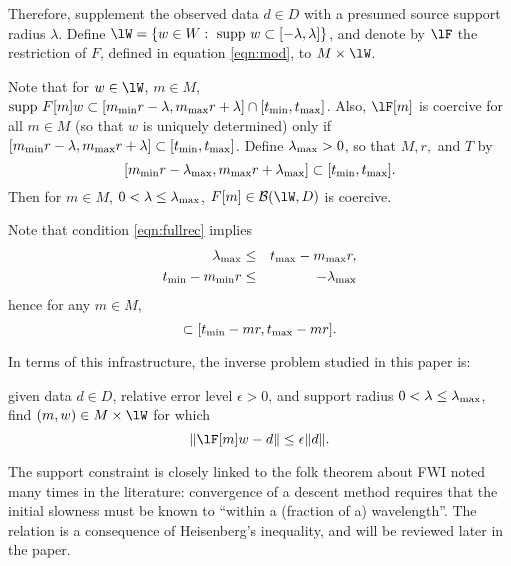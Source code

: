Therefore, supplement the observed data $d \in D$ with a presumed 
source support radius $\lambda$. Define 
$\lW=\{w \in W: \mbox{ supp }w \subset [-\lambda,\lambda]\}$, and 
denote by $\lF$ the restriction of $F$, defined in equation 
\ref{eqn:mod}, to $M \times \lW$.

Note that for $w \in \lW$, $m \in M$,
$\mbox{supp }F[m]w \subset [ m_{\rm min}r-\lambda,
m_{\rm max}r+\lambda] \cap
[t_{\rm min},t_{\rm max}]$. Also, $\lF[m]$ is coercive for all $m \in
M$ (so that $w$ is uniquely determined) only if
$[ m_{\rm min}r-\lambda,m_{\rm max}r+\lambda] \subset
[t_{\rm min},t_{\rm max}]$. Define $\lambda_{\rm max}
>0$, so that $M, r,$ and $T$ by
\begin{equation}
  \label{eqn:fullrec}
  [ m_{\rm min}r-\lambda_{\rm max}, m_{\rm max}r+\lambda_{\rm max}]
  \subset [t_{\rm min},t_{\rm max}].
\end{equation}
Then for 
$m \in M$, $0 <\lambda \le \lambda_{\rm max}$, $F[m] \in {\cal B}(\lW,D)$ is coercive.

Note that condition \ref{eqn:fullrec} implies
\begin{eqnarray}
  \lambda_{\rm max} & \le & t_{\rm max}-m_{\rm max}r,\nonumber \\
  t_{\rm min}-m_{\rm min}r & \le & -\lambda_{\rm max} \label{eqn:lminc}
\end{eqnarray}
hence for any $m \in M$,
\begin{equation}
  [-\lambda_{\rm max}, -\lambda_{\rm max}] \subset[ t_{\rm min}-mr ,
  t_{\rm max}-mr].
  \label{eqn:zeroinc}
\end{equation}

In terms of this infrastructure, the inverse problem studied in 
this paper is: 

 given data $d \in D$, relative 
error level $\epsilon >0$, and support radius $0 <\lambda \le 
\lambda_{\rm max}$, find 
$(m,w) \in M \times \lW$ for which 
\begin{equation}
  \label{eqn:probstat0}
  \|\lF[m]w-d\| \le \epsilon\|d\|. 
\end{equation}

 The support constraint is closely linked to the
folk theorem about FWI noted many times in the literature: convergence
of a descent method requires that the initial slowness must be known
to ``within a (fraction of a) wavelength''. The relation is a
consequence of Heisenberg's inequality, and will be reviewed later in
the paper.

